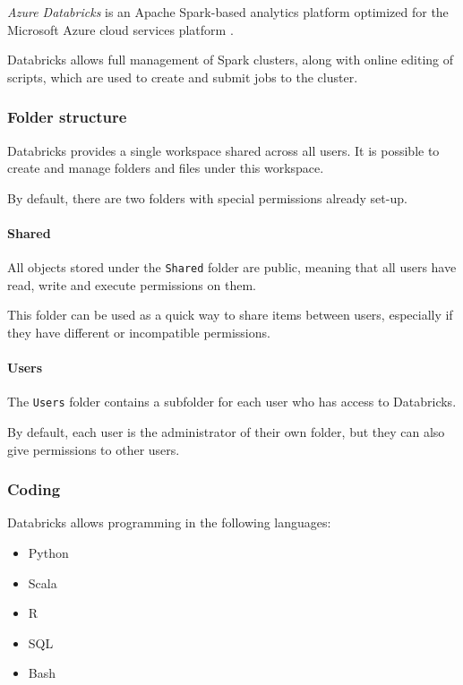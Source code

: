 \label{section:azure:databricks}

\textit{Azure Databricks} is an Apache Spark-based analytics platform optimized for the Microsoft Azure cloud services platform \cite{bib:azure:databricks:description}.

Databricks allows full management of Spark clusters, along with online editing of scripts, which are used to create and submit jobs to the cluster.

\subsubsection{Folder structure}
    Databricks provides a single workspace shared across all users.
    It is possible to create and manage folders and files under this workspace.
    
    By default, there are two folders with special permissions already set-up.
    
    \paragraph{Shared}
        All objects stored under the \texttt{Shared} folder are public, meaning that all users have read, write and execute permissions on them.
        
        This folder can be used as a quick way to share items between users, especially if they have different or incompatible permissions.
        
    \paragraph{Users}
        The \texttt{Users} folder contains a subfolder for each user who has access to Databricks.
        
        By default, each user is the administrator of their own folder, but they can also give permissions to other users.

\subsubsection{Coding}
    Databricks allows programming in the following languages:
        \begin{itemize}
            \item Python
            \item Scala
            \item R
            \item SQL
            \item Bash
        \end{itemize}
    

